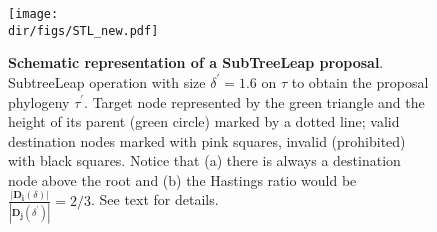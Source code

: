 \begin{figure}[!ht]
\begin{center}
\texttt{[image: \\dir/figs/STL\_new.pdf]} 
\end{center}
 \caption[Schematic representation of a SubTreeLeap proposal]{\textbf{Schematic representation of a SubTreeLeap proposal}.
 SubtreeLeap operation with size  $\delta^\prime = 1.6$ on $\tau$ to obtain the proposal phylogeny $\tau^\prime$.
 Target node represented by the green triangle and the height of its parent (green circle) marked by a dotted line; valid destination nodes marked with pink squares, invalid (prohibited) with black squares.
 Notice that (a) there is always a destination node above the root and (b) the Hastings ratio would be $ \frac{|\mathbf{D_i}(\delta)|}{|\mathbf{D_j}(\delta^\prime)|} = 2/3$.
 See text for details.
}
 \label{fig:stl}
\end{figure}

